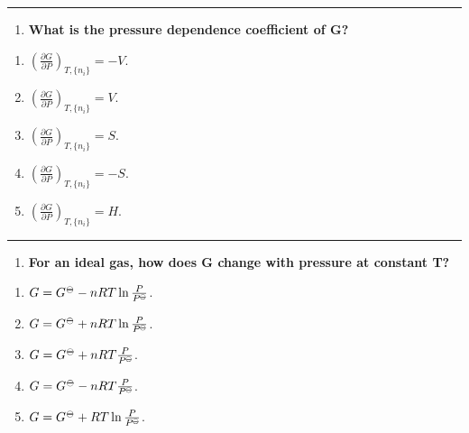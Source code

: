 \documentclass[
  9pt,
]{extbook}
\providecommand{\tightlist}{%
  \setlength{\itemsep}{0pt}\setlength{\parskip}{0pt}}
\theoremstyle{definition}
\theoremstyle{definition}
\theoremstyle{definition}
\theoremstyle{remark}
\begin{document}
\begin{center}\rule{0.5\linewidth}{0.5pt}\end{center}

\begin{enumerate}
\def\labelenumi{\arabic{enumi}.}
\setcounter{enumi}{4}
\tightlist
\item
  \textbf{What is the pressure dependence coefficient of G?}
\end{enumerate}

\begin{enumerate}
\def\labelenumi{\alph{enumi}.}
\tightlist
\item
  \(\left(\frac{\partial G}{\partial P}\right)_{T,\{n_i\}} = -V\).
\item
  \(\left(\frac{\partial G}{\partial P}\right)_{T,\{n_i\}} = V\).
\item
  \(\left(\frac{\partial G}{\partial P}\right)_{T,\{n_i\}} = S\).
\item
  \(\left(\frac{\partial G}{\partial P}\right)_{T,\{n_i\}} = -S\).
\item
  \(\left(\frac{\partial G}{\partial P}\right)_{T,\{n_i\}} = H\).
\end{enumerate}

\begin{center}\rule{0.5\linewidth}{0.5pt}\end{center}

\begin{enumerate}
\def\labelenumi{\arabic{enumi}.}
\setcounter{enumi}{5}
\tightlist
\item
  \textbf{For an ideal gas, how does G change with pressure at constant T?}
\end{enumerate}

\begin{enumerate}
\def\labelenumi{\alph{enumi}.}
\tightlist
\item
  \(G = G^{{-\kern-6pt{\ominus}\kern-6pt-}} - nRT\ln\frac{P}{P^{{-\kern-6pt{\ominus}\kern-6pt-}}}\).
\item
  \(G = G^{{-\kern-6pt{\ominus}\kern-6pt-}} + nRT\ln\frac{P}{P^{{-\kern-6pt{\ominus}\kern-6pt-}}}\).
\item
  \(G = G^{{-\kern-6pt{\ominus}\kern-6pt-}} + nRT\frac{P}{P^{{-\kern-6pt{\ominus}\kern-6pt-}}}\).
\item
  \(G = G^{{-\kern-6pt{\ominus}\kern-6pt-}} - nRT\frac{P}{P^{{-\kern-6pt{\ominus}\kern-6pt-}}}\).
\item
  \(G = G^{{-\kern-6pt{\ominus}\kern-6pt-}} + RT\ln\frac{P}{P^{{-\kern-6pt{\ominus}\kern-6pt-}}}\).
\end{enumerate}
\end{document}
